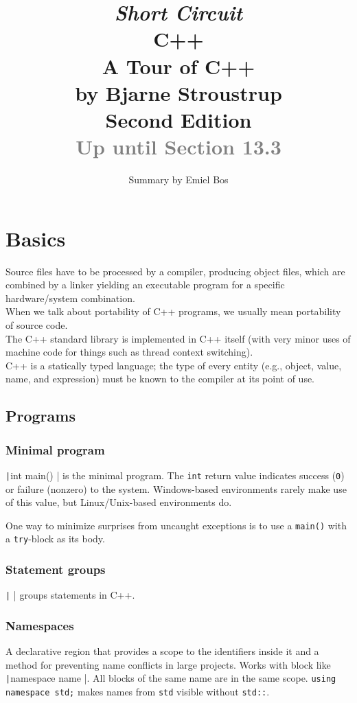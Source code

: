 \documentclass[table, xcdraw]{article}%
\title{
\textit{Short Circuit}\\
\vspace{15px}
\huge
C++\\
\vspace{20px}
\large
A Tour of C++\\
by Bjarne Stroustrup\\
Second Edition\\
\textcolor{gray}{Up until Section 13.3}
}
\author{Summary by Emiel Bos}
\date{}
\begin{document}
\maketitle

\section{Basics}

Source files have to be processed by a compiler, producing object files, which are combined by a linker yielding an executable program for a specific hardware/system combination.\\
When we talk about portability of C++ programs, we usually mean portability of source code.\\
The C++ standard library is implemented in C++ itself (with very minor uses of machine code for things such as thread context switching).\\
C++ is a statically typed language; the type of every entity (e.g., object, value, name, and expression) must be known to the compiler at its point of use.

\subsection{Programs}

\subsubsection{Minimal program}
\texttt|int main() { }| is the minimal program.
The \texttt{int} return value indicates success (\texttt{0}) or failure (nonzero) to the system. Windows-based environments rarely make use of this value, but Linux/Unix-based environments do.

One way to minimize surprises from uncaught exceptions is to use a \texttt{main()} with a \texttt{try}-block as its body.

\subsubsection{Statement groups}
\texttt|{ }| groups statements in C++.

\subsubsection{Namespaces}
A declarative region that provides a scope to the identifiers inside it and a method for preventing name conflicts in large projects. Works with block like \texttt|namespace name { }|. All blocks of the same name are in the same scope. \texttt{using namespace std;} makes names from \texttt{std} visible without \texttt{std::}.
\end{document}
